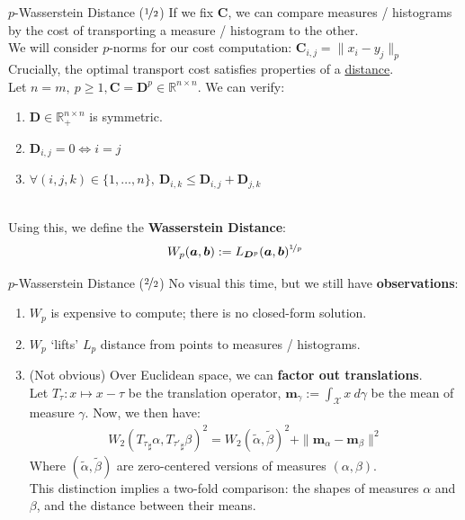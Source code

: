 \documentclass{beamer}
\begin{document}
\begin{frame}{$p$-Wasserstein Distance ($\nicefrac{1}{2}$)}
	If we fix $\bm{C}$, we can compare measures / histograms by the cost of transporting a measure / histogram to the other. \pause \newline \\
	
	We will consider $p$-norms for our cost computation: $\bm{C}_{i,j} = \| x_i  - y_j \|_p$ \pause \newline \\

	Crucially, the optimal transport cost satisfies properties of a \underline{distance}. \pause \newline \\

	Let $n = m,~p \geq 1, \bm{C} = \bm{D}^p \in \mathbb{R}^{n \times n}$. We can verify:
	\begin{enumerate}[label=\arabic*.]
		\item $\bm{D} \in \mathbb{R}^{n \times n}_+$ is symmetric. \pause
		\item $\bm{D}_{i,j} = 0 \iff i = j$ \pause
		\item $\forall (i, j, k) \in \{1, \ldots, n\},~\bm{D}_{i,k} \leq \bm{D}_{i, j} + \bm{D}_{j, k}$ \pause
	\end{enumerate}
	~ \\
	Using this, we define the \textbf{Wasserstein Distance}:
	\begin{gather}
		W_p (\bm{a}, \bm{b}) := L_{\bm{D}^p}(\bm{a}, \bm{b})^{\nicefrac{1}{p}}
	\end{gather}
\end{frame}

\begin{frame}{$p$-Wasserstein Distance ($\nicefrac{2}{2}$)}
	No visual this time, but we still have \textbf{observations}:
	\begin{enumerate}[label=\arabic*.]
		\item $W_p$ is expensive to compute; there is no closed-form solution. \pause
		\item $W_p$ `lifts' $L_p$ distance from points to measures / histograms. \pause
		\item (Not obvious) Over Euclidean space, we can \textbf{factor out translations}. \pause \newline \\
			Let $T_\tau : x \mapsto x - \tau$ be the translation operator, $\bm{m}_\gamma := \int_{\mathcal{X}} x~d\gamma$ be the mean of measure $\gamma$. Now, we then have:
			\begin{gather}
				W_2({T_\tau}_{\sharp} \alpha, {T_{\tau'}}_{\sharp} \beta)^2 = W_2(\tilde{\alpha}, \tilde{\beta})^2 + \| \bm{m}_\alpha - \bm{m}_\beta \|^2
			\end{gather}
			Where $(\tilde{\alpha}, \tilde{\beta})$ are zero-centered versions of measures $(\alpha, \beta)$. \pause \newline \\
			This distinction implies a two-fold comparison: the shapes of measures $\alpha$ and $\beta$, and the distance between their means.
	\end{enumerate}
\end{frame}
\end{document}
